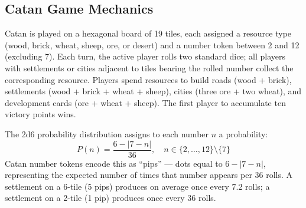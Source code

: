 \documentclass[12pt,a4paper]{article}
\begin{document}
\subsection{Catan Game Mechanics}

Catan is played on a hexagonal board of 19 tiles, each assigned a
resource type (wood, brick, wheat, sheep, ore, or desert) and a number
token between 2 and 12 (excluding 7). Each turn, the active player rolls
two standard dice; all players with settlements or cities adjacent to
tiles bearing the rolled number collect the corresponding resource.
Players spend resources to build roads (wood + brick), settlements
(wood + brick + wheat + sheep), cities (three ore + two wheat), and
development cards (ore + wheat + sheep). The first player to accumulate
ten victory points wins.

The 2d6 probability distribution assigns to each number $n$ a
probability:
\begin{equation}
  P(n) = \frac{6 - |7 - n|}{36}, \quad n \in \{2,\ldots,12\}
  \setminus \{7\}
  \label{eq:pip_prob}
\end{equation}
Catan number tokens encode this as ``pips'' --- dots equal to
$6 - |7-n|$, representing the expected number of times that number
appears per 36 rolls. A settlement on a 6-tile (5 pips) produces on
average once every 7.2 rolls; a settlement on a 2-tile (1 pip) produces
once every 36 rolls.
\end{document}
